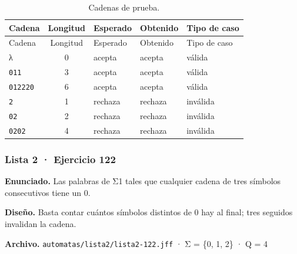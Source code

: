 \begin{longtable}[]{@{}lclll@{}}
\caption{Cadenas de prueba.}\tabularnewline
\toprule\noalign{}
Cadena & Longitud & Esperado & Obtenido & Tipo de caso \\
\midrule\noalign{}
\endfirsthead
\toprule\noalign{}
Cadena & Longitud & Esperado & Obtenido & Tipo de caso \\
\midrule\noalign{}
\endhead
\bottomrule\noalign{}
\endlastfoot
λ & 0 & acepta & acepta & válida \\
\texttt{011} & 3 & acepta & acepta & válida \\
\texttt{012220} & 6 & acepta & acepta & válida \\
\texttt{2} & 1 & rechaza & rechaza & inválida \\
\texttt{02} & 2 & rechaza & rechaza & inválida \\
\texttt{0202} & 4 & rechaza & rechaza & inválida \\
\end{longtable}


\hypertarget{lista-2-ejercicio-122}{%
\subsubsection{Lista 2 · Ejercicio 122}\label{lista-2-ejercicio-122}}

\textbf{Enunciado.} Las palabras de Σ1 tales que cualquier cadena de tres símbolos consecutivos tiene un 0.

\textbf{Diseño.} Basta contar cuántos símbolos distintos de 0 hay al final; tres seguidos invalidan la cadena.

\textbf{Archivo.} \texttt{automatas/lista2/lista2-122.jff} · Σ = \{0, 1, 2\} · \textbar Q\textbar{} = 4

